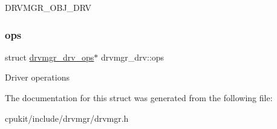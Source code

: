 D\+R\+V\+M\+G\+R\+\_\+\+O\+B\+J\+\_\+\+D\+RV \mbox{\label{structdrvmgr__drv_a6d7671f3f2f42f4536cf1acbd0650405}} 
\subsubsection{\texorpdfstring{ops}{ops}}
{\footnotesize\ttfamily struct \mbox{\hyperlink{structdrvmgr__drv__ops}{drvmgr\+\_\+drv\+\_\+ops}}$\ast$ drvmgr\+\_\+drv\+::ops}

Driver operations 

The documentation for this struct was generated from the following file\+:\begin{DoxyCompactItemize}
\item 
cpukit/include/drvmgr/drvmgr.\+h\end{DoxyCompactItemize}
